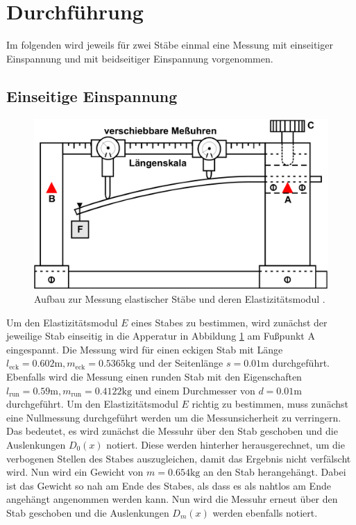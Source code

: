 \section{Durchführung}
\label{sec:Durchführung}

Im folgenden wird jeweils für zwei Stäbe einmal eine Messung mit einseitiger Einspannung
und mit beidseitiger Einspannung vorgenommen.

\subsection{Einseitige Einspannung}
\label{sec:EinsetigeEinspannung}

\begin{figure} %
    \centering
    \includegraphics[width=\textwidth]{pictures/EinspannungEineSeite.png}
    \caption{Aufbau zur Messung elastischer Stäbe und deren Elastizitätsmodul \cite{v103}.}
    \label{fig:EinsetigeEinspannung}
\end{figure}

Um den Elastizitätsmodul $E$ eines Stabes zu bestimmen, wird zunächst der jeweilige Stab einseitig in die Apperatur
in Abbildung \ref{fig:EinsetigeEinspannung} am Fußpunkt A eingespannt.
Die Messung wird für einen eckigen Stab mit Länge $l_\text{eck} = 0.602 \unit\meter , m_\text{eck} = 0.5365 \unit{\kilo\gram}$
und der Seitenlänge $s = 0.01 \unit\meter$ durchgeführt.
Ebenfalls wird die Messung einen runden Stab mit den Eigenschaften $l_\text{run} = 0.59 \unit\meter , m_\text{run} = 0.4122 \unit{\kilo\gram}$
und einem Durchmesser von $d = 0.01 \unit\meter$ durchgeführt.
Um den Elastizitätsmodul $E$ richtig zu bestimmen, muss zunächst eine Nullmessung durchgeführt werden um die Messunsicherheit zu verringern.
Das bedeutet, es wird zunächst die Messuhr über den Stab geschoben und die Auslenkungen $D_0 (x)$ notiert.
Diese werden hinterher herausgerechnet, um die verbogenen Stellen des Stabes auszugleichen, damit das Ergebnis nicht verfälscht wird.
Nun wird ein Gewicht von $m = 0.654 \unit{\kilo\gram}$ an den Stab herangehängt.
Dabei ist das Gewicht so nah am Ende des Stabes, als dass es als nahtlos am Ende angehängt angenommen werden kann.
Nun wird die Messuhr erneut über den Stab geschoben und die Auslenkungen $D_m (x)$ werden ebenfalls notiert.

